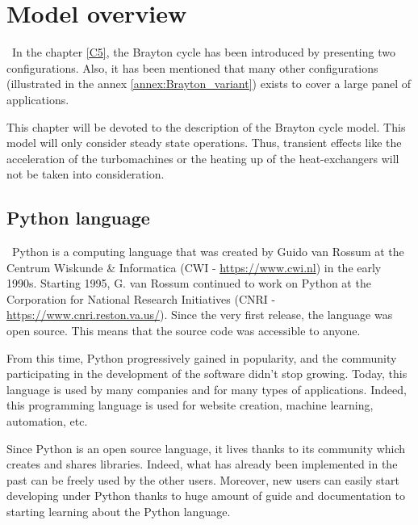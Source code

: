 \graphicspath{{Chapitre_6/Images/}}
\chapter{Model overview}\label{C6}
\quad\, In the chapter \ref{C5}, the Brayton cycle has been introduced by presenting two configurations. Also, it has been mentioned that many other configurations (illustrated in the annex \ref{annex:Brayton_variant}) exists to cover a large panel of applications. 

This chapter will be devoted to the description of the  Brayton cycle model. This model will only consider steady state operations. Thus, transient effects like the acceleration of the turbomachines or the heating up of the heat-exchangers will not be taken into consideration.
 

\section{Python language}
\quad\, Python is a computing language that was created by Guido van Rossum at the Centrum Wiskunde \& Informatica (CWI - \url{https://www.cwi.nl}) in the early 1990s. Starting 1995, G. van Rossum continued to work on Python at the Corporation for National Research Initiatives (CNRI - \url{https://www.cnri.reston.va.us/}). Since the very first release, the language was open source. This means that the source code was accessible to anyone. 

From this time, Python progressively gained in popularity, and the community participating in the development of the software didn't stop growing. Today, this language is used by many companies and for many types of applications. Indeed, this programming language is used for website creation, machine learning, automation, etc. 

Since Python is an open source language, it lives thanks to its community which creates and shares libraries. Indeed, what has already been implemented in the past can be freely used by the other users. Moreover, new users can easily start developing under Python thanks to huge amount of guide and documentation to starting learning about the Python language.


